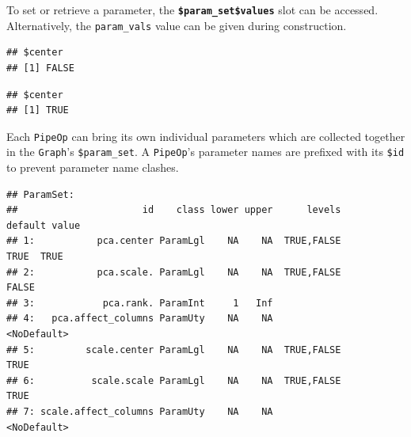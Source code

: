 \documentclass[]{scrbook}
\newenvironment{Shaded}{\begin{snugshade}}{\end{snugshade}}
\newcommand{\DataTypeTok}[1]{\textcolor[rgb]{0.13,0.29,0.53}{#1}}
\newcommand{\KeywordTok}[1]{\textcolor[rgb]{0.13,0.29,0.53}{\textbf{#1}}}
\newcommand{\NormalTok}[1]{#1}
\newcommand{\OperatorTok}[1]{\textcolor[rgb]{0.81,0.36,0.00}{\textbf{#1}}}
\newcommand{\OtherTok}[1]{\textcolor[rgb]{0.56,0.35,0.01}{#1}}
\newcommand{\StringTok}[1]{\textcolor[rgb]{0.31,0.60,0.02}{#1}}
\renewenvironment{Shaded} {\begin{snugshade}\small} {\end{snugshade}}
\begin{document}
To set or retrieve a parameter, the \textbf{\texttt{\$param\_set\$values}} slot can be accessed.
Alternatively, the \texttt{param\_vals} value can be given during construction.

\begin{Shaded}
\end{Shaded}

\begin{verbatim}
## $center
## [1] FALSE
\end{verbatim}

\begin{Shaded}
\end{Shaded}

\begin{verbatim}
## $center
## [1] TRUE
\end{verbatim}

Each \texttt{PipeOp} can bring its own individual parameters which are collected together in the \texttt{Graph}'s \texttt{\$param\_set}.
A \texttt{PipeOp}'s parameter names are prefixed with its \texttt{\$id} to prevent parameter name clashes.

\begin{Shaded}
\end{Shaded}

\begin{verbatim}
## ParamSet: 
##                      id    class lower upper      levels     default value
## 1:           pca.center ParamLgl    NA    NA  TRUE,FALSE        TRUE  TRUE
## 2:           pca.scale. ParamLgl    NA    NA  TRUE,FALSE       FALSE      
## 3:            pca.rank. ParamInt     1   Inf                              
## 4:   pca.affect_columns ParamUty    NA    NA             <NoDefault>      
## 5:         scale.center ParamLgl    NA    NA  TRUE,FALSE        TRUE      
## 6:          scale.scale ParamLgl    NA    NA  TRUE,FALSE        TRUE      
## 7: scale.affect_columns ParamUty    NA    NA             <NoDefault>
\end{verbatim}
\end{document}
